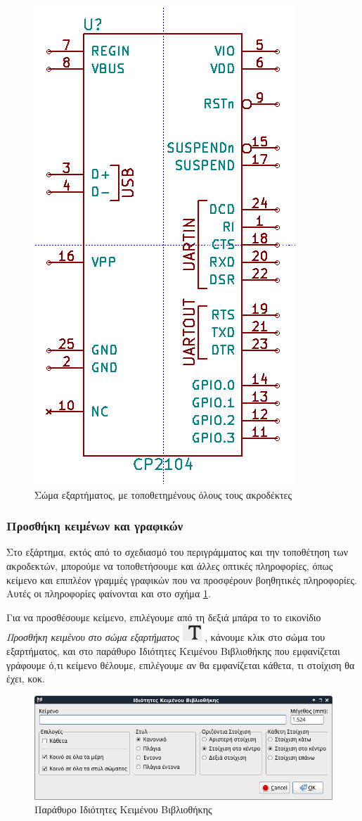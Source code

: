 \documentclass[a4paper]{article}
\begin{document}
\begin{figure}
  \begin{center}
    \includegraphics[width=.35\textwidth]{img/libed-circ-allpinslaced.png}
    \caption{Σώμα εξαρτήματος, με τοποθετημένους όλους τους ακροδέκτες}
    \label{fig:libed-circ-allpinslaced}
  \end{center}
\end{figure}

\subsubsection{Προσθήκη κειμένων και γραφικών}

Στο εξάρτημα, εκτός από το σχεδιασμό του περιγράμματος και την τοποθέτηση των ακροδεκτών, μπορούμε να τοποθετήσουμε και άλλες οπτικές πληροφορίες, όπως κείμενο και επιπλέον γραμμές γραφικών που να προσφέρουν βοηθητικές πληροφορίες. Αυτές οι πληροφορίες φαίνονται και στο σχήμα \ref{fig:libed-circ-allpinslaced}.

Για να προσθέσουμε κείμενο, επιλέγουμε από τη δεξιά μπάρα το το εικονίδιο \textit{Προσθήκη κειμένου στο σώμα εξαρτήματος} \includegraphics[scale=.5]{img/libed-ico-text.png}
, κάνουμε κλικ στο σώμα του εξαρτήματος, και στο παράθυρο Ιδιότητες Κειμένου Βιβλιοθήκης \label{fig:libed-dial-text} που εμφανίζεται γράφουμε ό,τι κείμενο θέλουμε, επιλέγουμε αν θα εμφανίζεται κάθετα, τι στοίχιση θα έχει, κοκ.

\begin{figure}
  \begin{center}
    \includegraphics[width=.5\textwidth]{img/libed-dial-text.png}
    \caption{Παράθυρο Ιδιότητες Κειμένου Βιβλιοθήκης}
    \label{fig:libed-dial-text}
  \end{center}
\end{figure}
\end{document}

